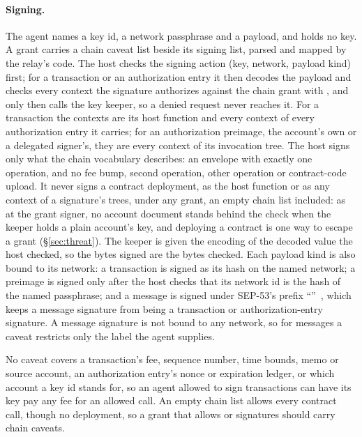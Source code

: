 \paragraph{Signing.} The agent names a key id, a network passphrase and a
payload, and holds no key. A grant carries a chain caveat list beside its
signing list, parsed and mapped by the relay's code. The host checks the
signing action (key, network, payload kind) first; for a transaction or an
authorization entry it then decodes the payload and checks every context the
signature authorizes against the chain grant with , and
only then calls the key keeper, so a denied request never reaches
it. For a transaction the contexts are its
host function and every context of every authorization entry it carries; for
an authorization preimage, the account's own or a delegated signer's, they
are every context of its invocation tree. The host
signs only what the chain vocabulary describes: an envelope with exactly one
 operation, and no fee bump, second operation,
other operation or contract-code upload. It never signs a contract
deployment, as the host function or as any context of a signature's trees,
under any grant, an empty chain list included: as
at the grant signer, no account document stands behind the check when the
keeper holds a plain account's key, and deploying a contract is one way to
escape a grant (\S\ref{sec:threat}). The
keeper is given the encoding of the decoded value the host checked, so the
bytes signed are the bytes checked. Each payload
kind is also bound to its network: a transaction is signed as its hash on the
named network; a preimage is signed only after the host checks that its
network id is the hash of the named passphrase;
and a message is signed under SEP-53's prefix ``''~\cite{sep53}, which keeps a message signature from
being a transaction or authorization-entry signature. A message signature is
not bound to any network, so for messages a  caveat restricts
only the label the agent supplies.

No caveat covers a transaction's fee, sequence number, time bounds, memo or
source account, an authorization entry's nonce or expiration ledger, or which
account a key id stands for, so an agent allowed to sign transactions can have
its key pay any fee for an allowed call. An empty chain list allows every
contract call, though no deployment, so a grant that allows
 or  signatures should carry chain caveats.
